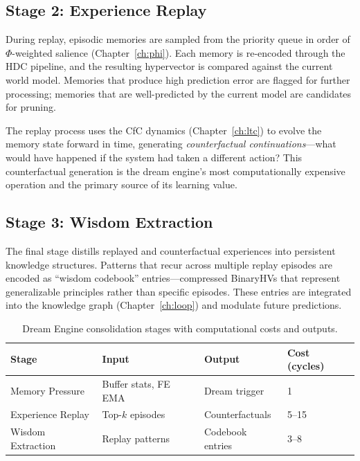 \documentclass[12pt]{book}
\begin{document}
\subsection{Stage 2: Experience Replay}

During replay, episodic memories are sampled from the priority queue in order of $\Phi$-weighted salience (Chapter~\ref{ch:phi}). Each memory is re-encoded through the HDC pipeline, and the resulting hypervector is compared against the current world model. Memories that produce high prediction error are flagged for further processing; memories that are well-predicted by the current model are candidates for pruning.

The replay process uses the CfC dynamics (Chapter~\ref{ch:ltc}) to evolve the memory state forward in time, generating \textit{counterfactual continuations}---what would have happened if the system had taken a different action? This counterfactual generation is the dream engine's most computationally expensive operation and the primary source of its learning value.

\subsection{Stage 3: Wisdom Extraction}

The final stage distills replayed and counterfactual experiences into persistent knowledge structures. Patterns that recur across multiple replay episodes are encoded as ``wisdom codebook'' entries---compressed BinaryHVs that represent generalizable principles rather than specific episodes. These entries are integrated into the knowledge graph (Chapter~\ref{ch:loop}) and modulate future predictions.

\begin{table}[htbp]
\centering
\caption{Dream Engine consolidation stages with computational costs and outputs.}
\label{tab:dream-stages}
\begin{tabular}{@{}llll@{}}
\toprule
\textbf{Stage} & \textbf{Input} & \textbf{Output} & \textbf{Cost (cycles)} \\
\midrule
Memory Pressure  & Buffer stats, FE EMA & Dream trigger     & 1 \\
Experience Replay & Top-$k$ episodes    & Counterfactuals   & 5--15 \\
Wisdom Extraction & Replay patterns     & Codebook entries  & 3--8 \\
\bottomrule
\end{tabular}
\end{table}
\end{document}
